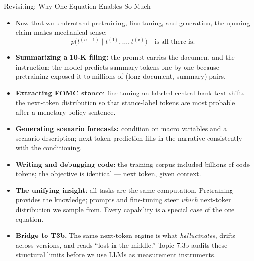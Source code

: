 \begin{frame}{Revisiting: Why One Equation Enables So Much}
\begin{itemize}
\item Now that we understand pretraining, fine-tuning, and generation, the opening claim makes mechanical sense:
\[
   p\bigl(t^{(n+1)} \mid t^{(1)}, \ldots, t^{(n)}\bigr) \quad \text{is all there is.}
\]

\medskip
\item \textbf{Summarizing a 10-K filing:} the prompt carries the document and the instruction; the model predicts summary tokens one by one because pretraining exposed it to millions of (long-document, summary) pairs.

\medskip
\item \textbf{Extracting FOMC stance:} fine-tuning on labeled central bank text shifts the next-token distribution so that stance-label tokens are most probable after a monetary-policy sentence.

\medskip
\item \textbf{Generating scenario forecasts:} condition on macro variables and a scenario description; next-token prediction fills in the narrative consistently with the conditioning.

\medskip
\item \textbf{Writing and debugging code:} the training corpus included billions of code tokens; the objective is identical --- next token, given context.

\medskip
\item \textbf{The unifying insight:} all tasks are the same computation. Pretraining provides the knowledge; prompts and fine-tuning steer \emph{which} next-token distribution we sample from. Every capability is a special case of the one equation.

\medskip
\item \textbf{Bridge to T3b.} The same next-token engine is what \emph{hallucinates}, drifts across versions, and reads ``lost in the middle.'' Topic 7.3b audits these structural limits before we use LLMs as measurement instruments.
\end{itemize}
\end{frame}


